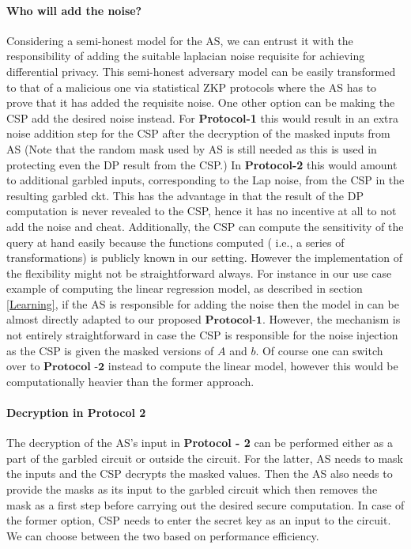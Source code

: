 \paragraph{Who will add the noise?}
Considering a semi-honest model for the AS, we can entrust it with the responsibility of adding the suitable laplacian noise requisite for achieving differential privacy. This semi-honest adversary model can be easily transformed to that of a malicious one via statistical ZKP protocols where the AS has to prove that it has added the requisite noise. One other option can be making the CSP add the desired noise instead.  For \textbf{Protocol-1} this would result in an extra noise addition step for the CSP after the decryption of the masked inputs from AS (Note that the random mask used by AS is still needed as this is used in protecting even the DP result from the CSP.)
In \textbf{Protocol-2} this would amount to additional garbled inputs, corresponding to the Lap noise, from the CSP in the resulting garbled ckt.
This has the advantage in that the result of the DP computation is never revealed to the CSP, hence it has no incentive at all to not add the noise and cheat.
Additionally, the CSP can compute the sensitivity of the query at hand easily because the functions computed ( i.e.,  a series of transformations) is publicly known in our setting.
However the implementation of the flexibility might not be straightforward always.   For instance in our use case example of computing the linear regression model,  as described in section \ref{Learning}, if the AS  is responsible for adding the noise then the model in \cite{LReg} can be almost directly adapted to  our proposed $\textbf{Protocol-1}$. However, the mechanism is not entirely straightforward in case the CSP is responsible for the noise injection as the CSP is given the masked versions of  $A$ and $b$. Of course one can switch over to  $\textbf{Protocol -2}$ instead to compute the linear model, however this would be computationally heavier than the former approach. 

\paragraph{Decryption in Protocol 2} The decryption of the AS's input in \textbf{Protocol - 2} can be performed either as a part of the garbled circuit or outside the circuit. For the latter, AS needs to mask the inputs and the CSP decrypts the masked values. Then the AS also  needs to provide the masks as its input to the garbled circuit which then removes the mask as a first step before carrying out the desired secure computation. In case of the former option, CSP needs to enter the secret key as an input to the circuit. We can choose between the two based on performance efficiency.\\
